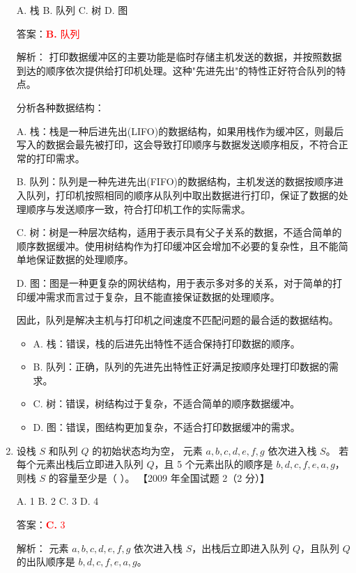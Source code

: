 \documentclass[lang=cn,newtx,10pt,scheme=chinese]{../../../elegantbook}
\begin{document}
\begin{enumerate}
    A. 栈 \quad B. 队列 \quad C. 树 \quad D. 图  

    答案：\textcolor{red}{\textbf{B.} 队列}

    解析：
    打印数据缓冲区的主要功能是临时存储主机发送的数据，并按照数据到达的顺序依次提供给打印机处理。这种"先进先出"的特性正好符合队列的特点。

    分析各种数据结构：
    
    A. 栈：栈是一种后进先出(LIFO)的数据结构，如果用栈作为缓冲区，则最后写入的数据会最先被打印，这会导致打印顺序与数据发送顺序相反，不符合正常的打印需求。

    B. 队列：队列是一种先进先出(FIFO)的数据结构，主机发送的数据按顺序进入队列，打印机按照相同的顺序从队列中取出数据进行打印，保证了数据的处理顺序与发送顺序一致，符合打印机工作的实际需求。

    C. 树：树是一种层次结构，适用于表示具有父子关系的数据，不适合简单的顺序数据缓冲。使用树结构作为打印缓冲区会增加不必要的复杂性，且不能简单地保证数据的处理顺序。

    D. 图：图是一种更复杂的网状结构，用于表示多对多的关系，对于简单的打印缓冲需求而言过于复杂，且不能直接保证数据的处理顺序。

    因此，队列是解决主机与打印机之间速度不匹配问题的最合适的数据结构。

    \begin{itemize}
        \item A. 栈：错误，栈的后进先出特性不适合保持打印数据的顺序。
        \item B. 队列：正确，队列的先进先出特性正好满足按顺序处理打印数据的需求。
        \item C. 树：错误，树结构过于复杂，不适合简单的顺序数据缓冲。
        \item D. 图：错误，图结构更加复杂，不适合打印数据缓冲的需求。
    \end{itemize}

    \item 设栈 $S$ 和队列 $Q$ 的初始状态均为空，
    元素 $a, b, c, d, e,f,g$ 依次进入栈 $S$。
    若每个元素出栈后立即进入队列 $Q$，且 5 个元素出队的顺序是 
    $b, d,c,f,e,a,g$，则栈 $S$ 的容量至少是（ ）。  
    【2009 年全国试题 2（2 分）】  
   
    A. 1 \quad B. 2 \quad C. 3 \quad D. 4  

    答案：\textcolor{red}{\textbf{C.} 3}

    解析：
    元素 $a, b, c, d, e, f, g$ 依次进入栈 $S$，出栈后立即进入队列 $Q$，且队列 $Q$ 的出队顺序是 $b, d, c, f, e, a, g$。


\end{enumerate}
\end{document}
